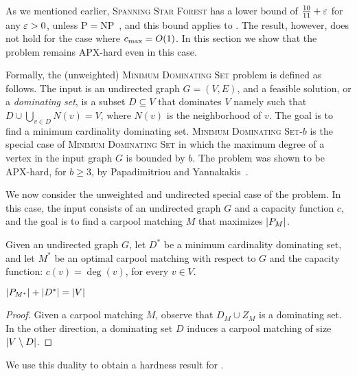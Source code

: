 As we mentioned earlier, \textsc{Spanning Star Forest} has a lower
bound of $\frac{10}{11} + \varepsilon$ for any $\varepsilon > 0$, unless
P$=$NP~\cite{ChakrabartyGoel10}, and this bound applies to \carpool.
The result, however, does not hold for the case where $c_{\max} = O(1)$.
In this section we show that the problem remains APX-hard even in this
case.

Formally, the (unweighted) \textsc{Minimum Dominating Set} problem is
defined as follows.  The input is an undirected graph $G = (V,E)$, and
a feasible solution, or a \emph{dominating set}, is a subset
$D \subseteq V$ that dominates $V$ namely such that
$D \cup \bigcup_{v \in D} N(v) = V$, where $N(v)$ is the neighborhood
of $v$.  The goal is to find a minimum cardinality dominating set.
%
\textsc{Minimum Dominating Set-$b$} is the special case of
\textsc{Minimum Dominating Set} in which
the maximum degree of a vertex in the input graph $G$ is bounded by
$b$.  The problem was shown to be APX-hard, for $b \geq 3$, by
Papadimitriou and Yannakakis~\cite{PapYan88}.

We now consider the unweighted and undirected special case of
the \carpool problem.  In this case, the input consists of an
undirected graph $G$ and a capacity function $c$, and the goal is to
find a carpool matching $M$ that maximizes $\left| P_M \right|$.

Given an undirected graph $G$, let $D^*$ be a minimum cardinality
dominating set, and let $M^*$ be an optimal carpool matching with
respect to $G$ and the capacity function: $c(v) = \deg(v)$, for every
$v \in V$.

\begin{observation}
$\left| P_{M^*} \right| + \left| D^* \right| = \left| V \right|$ 
\end{observation}
\begin{proof}
Given a carpool matching $M$, observe that $D_M \cup Z_M$ is a
dominating set.  In the other direction, a dominating set $D$ induces
a carpool matching of size $\left| V \setminus D \right|$.
\end{proof}

We use this duality to obtain a hardness result for \carpool.

